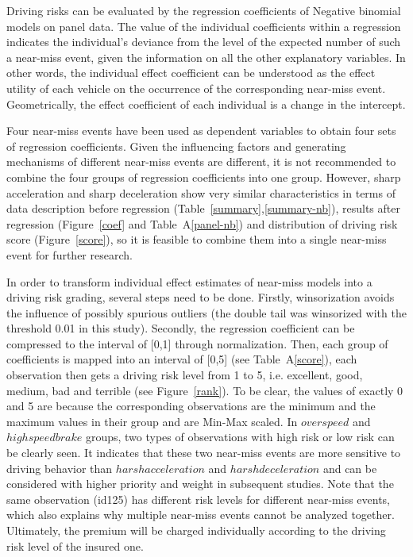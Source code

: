 \documentclass[entropy,article,submit,moreauthors,LaTeX and dvi2pdf]{Definitions/mdpi}
\begin{document}
\begin{paracol}{2}
Driving risks can be evaluated by the regression coefficients of Negative binomial models on panel data. The value of the individual coefficients within a regression indicates the individual's deviance from the level of the expected number of  such a near-miss event, given the information on all the other explanatory variables. In other words, the individual effect coefficient can be understood as the effect utility of each vehicle on the occurrence of the corresponding near-miss event. Geometrically, the effect coefficient of each individual is a change in the intercept.

Four near-miss events have been used as dependent variables to obtain four sets of regression coefficients. Given the influencing factors and generating mechanisms of different near-miss events are different, it is not recommended to combine the four groups of regression coefficients into one group. However, sharp acceleration and sharp deceleration show very similar characteristics in terms of data description before regression (Table~\ref{summary},\ref{summary-nb}), results after regression (Figure~\ref{coef} and Table~A\ref{panel-nb}) and distribution of driving risk score (Figure~\ref{score}), so it is feasible to combine them into a single near-miss event for further research.

In order to transform individual effect estimates of near-miss models into a driving risk grading, several steps need to be done. Firstly, winsorization avoids the influence of possibly spurious outliers (the double tail was winsorized with the threshold 0.01 in this study). Secondly, the regression coefficient can be compressed to the interval of [0,1] through normalization. Then, each group of coefficients is mapped into an interval of [0,5] (see Table~A\ref{score}), each observation then gets a driving risk level from 1 to 5, i.e. excellent, good, medium, bad and terrible (see Figure~\ref{rank}). To be clear, the values of exactly 0 and 5 are because the corresponding observations are the minimum and the maximum values in their group and are Min-Max scaled. In $overspeed$ and $highspeedbrake$ groups, two types of observations with high risk or low risk can be clearly seen. It indicates that these two near-miss events are more sensitive to driving behavior than $harshacceleration$ and $harshdeceleration$ and can be considered with higher priority and weight in subsequent studies. Note that the same observation (id125) has different risk levels for different near-miss events, which also explains why multiple near-miss events cannot be analyzed together. Ultimately, the premium will be charged individually according to the driving risk level of the insured one.

\end{paracol}
\end{document}
